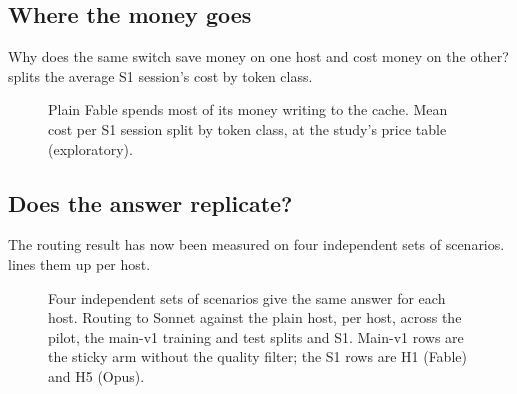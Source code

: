 \subsection{Where the money goes}

Why does the same switch save money on one host and cost money on the other?  splits the average S1 session's cost by token class.

\begin{figure}[htbp]
\centering
{}\par\smallskip

\caption{Plain Fable spends most of its money writing to the cache. Mean cost per S1 session split by token class, at the study's price table (exploratory).}
\label{fig:composition}
\end{figure}

\subsection{Does the answer replicate?}

The routing result has now been measured on four independent sets of scenarios.  lines them up per host.

\begin{figure}[htbp]
\centering
{}\par\smallskip

\caption{Four independent sets of scenarios give the same answer for each host. Routing to Sonnet against the plain host, per host, across the pilot, the main-v1 training and test splits
and S1. Main-v1 rows are the sticky arm without the quality filter; the S1 rows are H1 (Fable) and H5 (Opus).}
\label{fig:cumulative}
\end{figure}
\FloatBarrier

